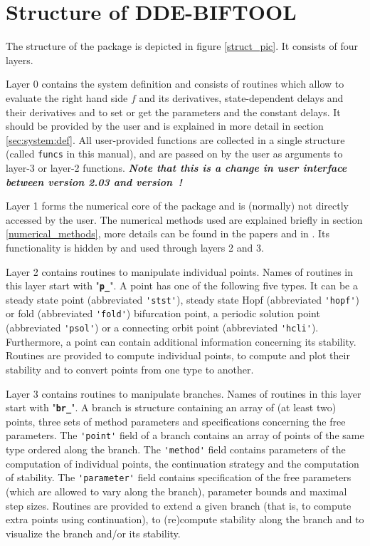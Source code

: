 \documentclass[10pt]{scrartcl}
\newcommand{\DDEBIFCODE}{\textsc{DDE-BIFTOOL}}
\newcommand{\file}[1]{\textbf{\texttt{#1}}}
\newcommand{\blist}[1]{\mbox{\lstinline!#1!}}
\begin{document}
\section{Structure of {\DDEBIFCODE}}\label{code_struct}

The structure of the package is depicted in figure \ref{struct_pic}.
It consists of four layers. 

Layer 0 contains the system definition and consists of routines which
allow to evaluate the right hand side $f$ and its derivatives,
state-dependent delays and their derivatives and to set or get the
parameters and the constant delays.  It should be provided by the user
and is explained in more detail in section \ref{sec:system:def}.  All
user-provided functions are collected in a single structure (called
\blist{funcs} in this manual), and are passed on by the user as
arguments to layer-3 or layer-2 functions. \textbf{\emph{Note that
    this is a change in user interface between version 2.03 and
    version~\version{}!}}

Layer 1 forms the numerical core of the package and is (normally)
not directly accessed by the user. The numerical methods used
are explained
briefly in section \ref{numerical_methods}, more
details can be found in the papers 
\cite{Luzy96,Enge99a,Enge99b,en_d01,engel01,luz01,homoclinic}
and in \cite{Enge00}. Its functionality is hidden by and used
through layers 2 and 3.

Layer 2 contains routines to manipulate individual points.  Names of
routines in this layer start with "\file{p\_}".  A point has one of
the following five types.  It can be a steady state point (abbreviated
\blist{'stst'}), steady state Hopf (abbreviated \blist{'hopf'}) or
fold (abbreviated \blist{'fold'}) bifurcation point, a periodic solution point
(abbreviated \blist{'psol'}) or a connecting orbit point (abbreviated
\blist{'hcli'}). Furthermore, a point can contain additional information
concerning its stability.  Routines are provided to compute individual
points, to compute and plot their stability and to convert points from
one type to another.

Layer 3 contains routines to manipulate branches.  Names of routines
in this layer start with "\file{br\_}". A branch is structure
containing an array of (at least two) points, three sets of method
parameters and specifications concerning the free parameters.  The
\blist{'point'} field of a branch contains an array of points of the
same type ordered along the branch.  The \blist{'method'} field
contains parameters of the computation of individual points, the
continuation strategy and the computation of stability.  The
\blist{'parameter'} field contains specification
of the free parameters (which are allowed to vary along the branch),
parameter bounds and maximal step sizes.  Routines are provided to
extend a given branch (that is, to compute extra points using
continuation), to (re)compute stability along the branch and to
visualize the branch and/or its stability.
\end{document}
